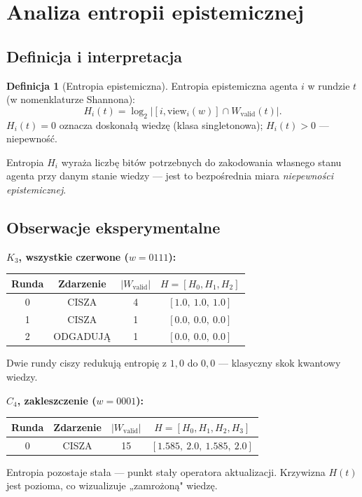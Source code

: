 \documentclass[12pt,a4paper]{article}
\theoremstyle{plain}
\theoremstyle{definition}
\newtheorem{definition}[theorem]{Definicja}
\theoremstyle{remark}
\newcommand{\view}{\mathrm{view}}
\newcommand{\Wval}{W_{\mathrm{valid}}}
\begin{document}
\section{Analiza entropii epistemicznej}

\subsection{Definicja i interpretacja}

\begin{definition}[Entropia epistemiczna]
Entropia epistemiczna agenta $i$ w rundzie $t$ (w nomenklaturze Shannona):
$$H_i(t) = \log_2 |[i, \view_i(w)] \cap \Wval(t)|.$$
$H_i(t) = 0$ oznacza doskonałą wiedzę (klasa singletonowa); $H_i(t) > 0$ — niepewność.
\end{definition}

Entropia $H_i$ wyraża liczbę bitów potrzebnych do zakodowania własnego stanu agenta przy danym stanie wiedzy — jest to bezpośrednia miara \emph{niepewności epistemicznej}.

\subsection{Obserwacje eksperymentalne}

\textbf{$K_3$, wszystkie czerwone ($w = 0111$):}
\begin{center}
\begin{tabular}{cccc}
\toprule
Runda & Zdarzenie & $|\Wval|$ & $H = [H_0, H_1, H_2]$ \\
\midrule
0 & CISZA & 4 & $[1.0,\ 1.0,\ 1.0]$ \\
1 & CISZA & 1 & $[0.0,\ 0.0,\ 0.0]$ \\
2 & ODGADUJĄ & 1 & $[0.0,\ 0.0,\ 0.0]$ \\
\bottomrule
\end{tabular}
\end{center}
Dwie rundy ciszy redukują entropię z $1{,}0$ do $0{,}0$ — klasyczny skok kwantowy wiedzy.

\textbf{$C_4$, zakleszczenie ($w = 0001$):}
\begin{center}
\begin{tabular}{cccc}
\toprule
Runda & Zdarzenie & $|\Wval|$ & $H = [H_0, H_1, H_2, H_3]$ \\
\midrule
0 & CISZA & 15 & $[1.585,\ 2.0,\ 1.585,\ 2.0]$ \\
\bottomrule
\end{tabular}
\end{center}
Entropia pozostaje stała — punkt stały operatora aktualizacji. Krzywizna $H(t)$ jest pozioma, co wizualizuje „zamrożoną" wiedzę.
\end{document}
